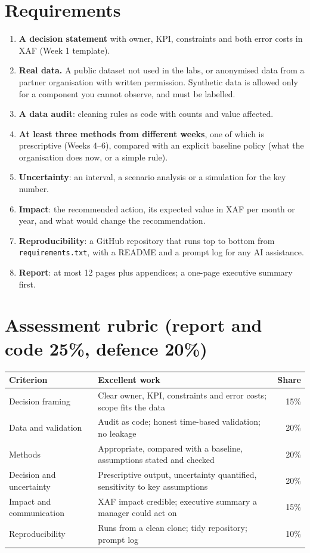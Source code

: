 \section*{Requirements}
\begin{enumerate}[nosep]
\item \textbf{A decision statement} with owner, KPI, constraints and both error costs in XAF (Week 1 template).
\item \textbf{Real data.} A public dataset not used in the labs, or anonymised data from a partner organisation with
written permission. Synthetic data is allowed only for a component you cannot observe, and must be labelled.
\item \textbf{A data audit}: cleaning rules as code with counts and value affected.
\item \textbf{At least three methods from different weeks}, one of which is prescriptive (Weeks 4--6), compared with
an explicit baseline policy (what the organisation does now, or a simple rule).
\item \textbf{Uncertainty}: an interval, a scenario analysis or a simulation for the key number.
\item \textbf{Impact}: the recommended action, its expected value in XAF per month or year, and what would change the
recommendation.
\item \textbf{Reproducibility}: a GitHub repository that runs top to bottom from \texttt{requirements.txt}, with a
README and a prompt log for any AI assistance.
\item \textbf{Report}: at most 12 pages plus appendices; a one-page executive summary first.
\end{enumerate}

\section*{Assessment rubric (report and code 25\%, defence 20\%)}
\begin{center}\small
\begin{tabularx}{\linewidth}{@{}L{3.6cm}Y r@{}}
\toprule
\textbf{Criterion} & \textbf{Excellent work} & \textbf{Share}\\\midrule
Decision framing & Clear owner, KPI, constraints and error costs; scope fits the data & 15\%\\
Data and validation & Audit as code; honest time-based validation; no leakage & 20\%\\
Methods & Appropriate, compared with a baseline, assumptions stated and checked & 20\%\\
Decision and uncertainty & Prescriptive output, uncertainty quantified, sensitivity to key assumptions & 20\%\\
Impact and communication & XAF impact credible; executive summary a manager could act on & 15\%\\
Reproducibility & Runs from a clean clone; tidy repository; prompt log & 10\%\\\bottomrule
\end{tabularx}
\end{center}

